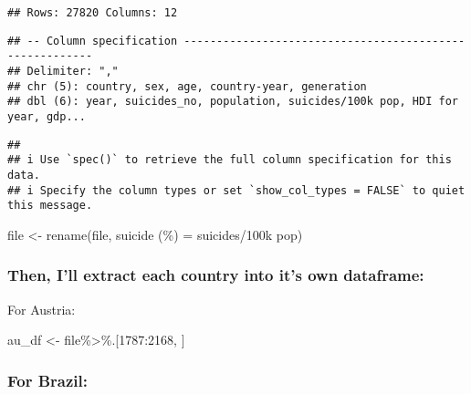 \documentclass[
]{article}
\newenvironment{Shaded}{\begin{snugshade}}{\end{snugshade}}
\newcommand{\AttributeTok}[1]{\textcolor[rgb]{0.77,0.63,0.00}{#1}}
\newcommand{\DecValTok}[1]{\textcolor[rgb]{0.00,0.00,0.81}{#1}}
\newcommand{\FunctionTok}[1]{\textcolor[rgb]{0.00,0.00,0.00}{#1}}
\newcommand{\NormalTok}[1]{#1}
\newcommand{\OtherTok}[1]{\textcolor[rgb]{0.56,0.35,0.01}{#1}}
\newcommand{\SpecialCharTok}[1]{\textcolor[rgb]{0.00,0.00,0.00}{#1}}
\newcommand{\StringTok}[1]{\textcolor[rgb]{0.31,0.60,0.02}{#1}}
\begin{document}
\begin{verbatim}
## Rows: 27820 Columns: 12
\end{verbatim}

\begin{verbatim}
## -- Column specification --------------------------------------------------------
## Delimiter: ","
## chr (5): country, sex, age, country-year, generation
## dbl (6): year, suicides_no, population, suicides/100k pop, HDI for year, gdp...
\end{verbatim}

\begin{verbatim}
## 
## i Use `spec()` to retrieve the full column specification for this data.
## i Specify the column types or set `show_col_types = FALSE` to quiet this message.
\end{verbatim}

\begin{Shaded}
\begin{Highlighting}[]
\NormalTok{file }\OtherTok{\textless{}{-}} \FunctionTok{rename}\NormalTok{(file, }\StringTok{\textasciigrave{}}\AttributeTok{suicide (\%)}\StringTok{\textasciigrave{}} \OtherTok{=} \StringTok{\textasciigrave{}}\AttributeTok{suicides/100k pop}\StringTok{\textasciigrave{}}\NormalTok{)}
\end{Highlighting}
\end{Shaded}

\hypertarget{then-ill-extract-each-country-into-its-own-dataframe}{%
\subsubsection{Then, I'll extract each country into it's own
dataframe:}\label{then-ill-extract-each-country-into-its-own-dataframe}}

For Austria:

\begin{Shaded}
\begin{Highlighting}[]
\NormalTok{au\_df }\OtherTok{\textless{}{-}}\NormalTok{ file}\SpecialCharTok{\%\textgreater{}\%}\NormalTok{.[}\DecValTok{1787}\SpecialCharTok{:}\DecValTok{2168}\NormalTok{, ]}
\end{Highlighting}
\end{Shaded}

\hypertarget{for-brazil}{%
\subsubsection{For Brazil:}\label{for-brazil}}
\end{document}
